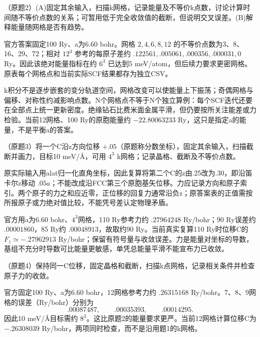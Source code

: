 \begin{exercise}\label{task:lab2-2}
（原题2）(A)固定其余输入，扫描k网格，记录能量及不等价k点数，讨论计算时间随不等价点数的关系；可暂用低于完全收敛值的截断，但说明交叉误差。(B)解释能量随网格是否有趋势。
\end{exercise}
\begin{solution}
官方答案固定100 Ry、a为6.60 bohr。网格 $2,4,6,8,12$ 的不等价点数为3、8、16、29、72；相对 $12^3$ 参考的每原子差约 $.122561,.005061,.000356,.000031,0$ Ry。因此该绝对能量指标在约 $6^3$ 已达到5 meV/atom，但后续力要求更密网格。原表每个网格点和当前实际SCF结果都存为独立CSV。

k积分不是逐步嵌套的变分轨道空间，网格改变可以使能量上下振荡；奇偶网格与偏移、对称性约减影响点数。N个网格点不等于N个独立算例：每个SCF迭代还要在全部点上统一更新密度。绝缘钻石比费米面金属平滑，但仍要按所关注能差或力检验。当前12网格、100 Ry的原胞能量约 $-22.80063233$ Ry，这只是指定a的能量，不是平衡a的答案。
\end{solution}

\begin{exercise}\label{task:lab2-3}
（原题3）将一个C沿z方向位移 $+.05$（原题称分数坐标），固定其余输入，扫描截断并画力，目标10 meV/\AA{}，可用 $4^3$ k网格；记录晶格、截断及不等价点数。
\end{exercise}
\begin{solution}
原实际输入用alat归一化直角坐标，因此复算将第二个C的z由.25改为.30，即沿笛卡尔z移动 $.05a$；不能改成沿FCC第三个原胞基矢位移。力应记录方向和原子索引。两个原子的力之和应近零，正位移的回复力通常沿负z；原答案表的正值需按所报原子或力绝对值比较，不能凭号差认定物理矛盾。

官方用a为6.60 bohr、$4^3$网格，110 Ry参考力约 $.27964248$ Ry/bohr；90 Ry误差约 $.00001860$，85 Ry约 $.00048913$，故取约90 Ry。当前真实复算110 Ry时位移C的 $F_z\simeq-.27962913$ Ry/bohr；保留有符号量与收敛误差。力是能量对坐标的导数，基组不充分时导数可比能量更敏感，单凭总能量平滑不能宣布力已收敛。
\end{solution}

\begin{exercise}\label{task:lab2-4}
（原题4）保持同一C位移，固定晶格和截断，扫描k点网格，记录相关条件并检查原子力的收敛。
\end{exercise}
\begin{solution}
官方固定100 Ry、a为6.60 bohr，12网格参考力约 $.26315168$ Ry/bohr。7、8、9网格的误差（Ry/bohr）分别为
\[ .00087487,\qquad .00035393,\qquad .00014295.\]
因此10 meV/\AA{}目标需约 $8^3$。这比原题2的能量要求更严。当前12网格计算位移C为 $-.26308039$ Ry/bohr，两项同时检查，而不是沿用题1的k网格。
\begin{center}\end{center}
\end{solution}

